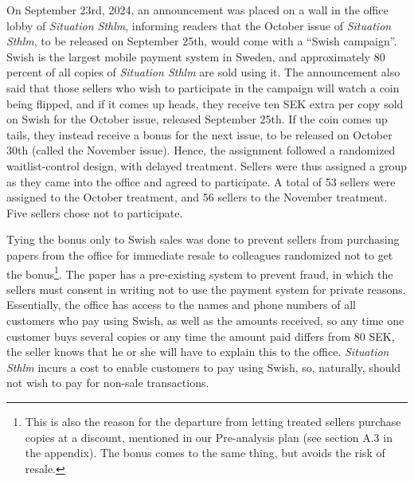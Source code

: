 \documentclass[12pt]{article}
\begin{document}
On September 23rd, 2024, an announcement was placed on a wall in the office lobby of \textit{Situation Sthlm}, informing readers that the October issue of \textit{Situation Sthlm}, to be released on September 25th, would come with a “Swish campaign”. Swish is the largest mobile payment system in Sweden, and approximately 80 percent of all copies of \textit{Situation Sthlm} are sold using it. The announcement also said that those sellers who wish to participate in the campaign will watch a coin being flipped, and if it comes up heads, they receive ten SEK extra per copy sold on Swish for the October issue, released September 25th. If the coin comes up tails, they instead receive a bonus for the next issue, to be released on October 30th (called the November issue). Hence, the assignment followed a randomized waitlist-control design, with delayed treatment. Sellers were thus assigned a group as they came into the office and agreed to participate. A total of 53 sellers were assigned to the October treatment, and 56 sellers to the November treatment. Five sellers chose not to participate.

Tying the bonus only to Swish sales was done to prevent sellers from purchasing papers from the office for immediate resale to colleagues randomized not to get the bonus\footnote{This is also the reason for the departure from letting treated sellers purchase copies at a discount, mentioned in our Pre-analysis plan (see section A.3 in the appendix). The bonus comes to the same thing, but avoids the risk of resale.}. The paper has a pre-existing system to prevent fraud, in which the sellers must consent in writing not to use the payment system for private reasons. Essentially, the office has access to the names and phone numbers of all customers who pay using Swish, as well as the amounts received, so any time one customer buys several copies or any time the amount paid differs from 80 SEK, the seller knows that he or she will have to explain this to the office. \textit{Situation Sthlm} incurs a cost to enable customers to pay using Swish, so, naturally, should not wish to pay for non-sale transactions.
\end{document}
